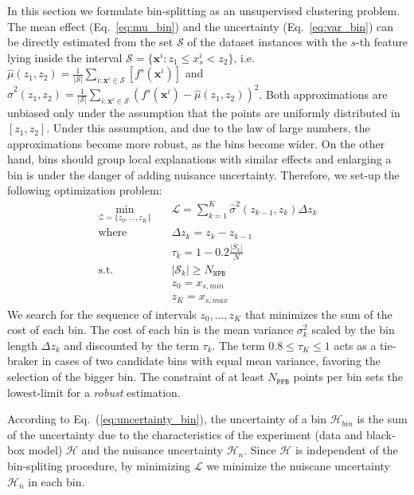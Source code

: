 \documentclass[twoside]{article}
\newcommand{\dfdx}{f^s}
\begin{document}
In this section we formulate bin-splitting as an unsupervised
clustering problem. The mean effect (Eq.~\eqref{eq:mu_bin}) and the
uncertainty (Eq.~\eqref{eq:var_bin}) can be directly estimated from
the set \(\mathcal{S}\) of the dataset instances with the \(s\)-th
feature lying inside the interval
\( \mathcal{S}= \{ \mathbf{x}^i : z_1 \leq x^i_s < z_2 \} \), i.e.
\(\hat{\mu}(z_1, z_2) = \frac{1}{|\mathcal{S}|} \sum_{i:\mathbf{x}^i
  \in \mathcal{S}} \left [ \dfdx(\mathbf{x}^i) \right ] \) and
\( \hat{\sigma}^2(z_1, z_2) = \frac{1}{|\mathcal{S}|}
\sum_{i:\mathbf{x}^i \in \mathcal{S}} \left ( \dfdx(\mathbf{x}^i) -
  \hat{\mu}(z_1, z_2) \right )^2 \). Both approximations are unbiased
only under the assumption that the points are uniformly distributed in
\([z_1, z_2]\). Under this assumption, and due to the law of large
numbers, the approximations become more robust, as the bins become
wider. On the other hand, bins should group local explanations with
similar effects and enlarging a bin is under the danger of adding
nuisance uncertainty. Therefore, we set-up the following optimization
problem:
\begin{equation}
  \label{eq:opt}
\begin{aligned}
  \min_{ \mathcal{Z} = \{z_0, \ldots, z_K\}} \quad & \mathcal{L} = \sum_{k=1}^K \hat{\sigma}^2(z_{k-1}, z_k) \Delta z_k \\
  \textrm{where} \quad & \Delta z_k = z_k - z_{k-1} \\
  & \tau_k = 1 - 0.2 \frac{|S_k|}{N} \\
  \textrm{s.t.} \quad & |\mathcal{S}_k| \geq N_{\mathtt{NPB}}\\
                                     & z_0 = x_{s,min}\\
                                     & z_K = x_{s, max}
\end{aligned}
\end{equation}
%
We search for the sequence of intervals \(z_0, \ldots, z_K\) that
minimizes the sum of the cost of each bin. The cost of each bin is the
mean variance \(\sigma^2_k\) scaled by the bin length \(\Delta z_k\)
and discounted by the term \(\tau_k\). The term
\(0.8 \leq \tau_K \leq 1\) acts as a tie-braker in cases of two
candidate bins with equal mean variance, favoring the selection of the
bigger bin. The constraint of at least \(N_{\mathtt{PPB}}\) points per
bin sets the lowest-limit for a \textit{robust} estimation.

According to Eq.~(\ref{eq:uncertainty_bin}), the uncertainty of a bin
\(\mathcal{H}_{bin}\) is the sum of the uncertainty due to the
characteristics of the experiment (data and black-box model)
\(\mathcal{H}\) and the nuisance uncertainty \(\mathcal{H}_n\). Since
\(\mathcal{H}\) is independent of the bin-spliting procedure, by
minimizing \(\mathcal{L}\) we minimize the nuiscane uncertainty
\(\mathcal{H}_n\) in each bin.
\end{document}
